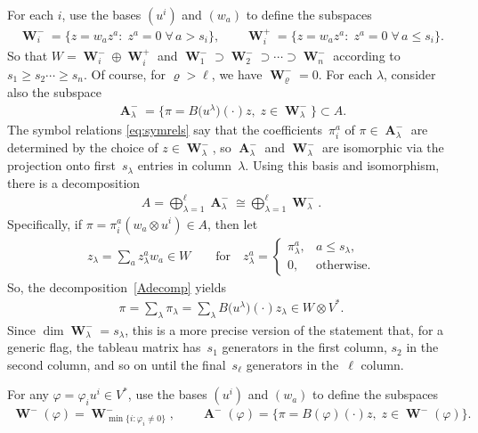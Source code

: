\documentclass[11pt]{article}
\numberwithin{equation}{section}
\DeclareMathOperator{\Au}{\mathbf{A}}
\DeclareMathOperator{\Wu}{\mathbf{W}}
\begin{document}
For each $i$, use the bases $(u^i)$ and $(w_a)$ to def\/ine the subspaces
\begin{gather*}
\Wu^-_i = \big\{ z =w_a z^a\colon \; z^a = 0\; \forall\, a > s_i \big\}, \qquad
\Wu^+_i = \big\{ z =w_a z^a\colon \;  z^a = 0\; \forall\, a \leq s_i \big\}.
\end{gather*}
So that $W =  \Wu^-_i \oplus \Wu^+_i$ and $\Wu^-_1 \supset
\Wu^-_2 \supset \cdots \supset \Wu^-_n$ according to $s_1 \geq s_2
\cdots \geq s_n$.  Of course, for $\varrho > \ell$, we have
$\Wu^-_\varrho = 0$.  For each $\lambda$, consider also the subspace
\begin{gather*}
\Au^-_\lambda = \big\{ \pi = B\big(u^\lambda\big)(\cdot)z,\; z \in \Wu^-_\lambda\big\} \subset
A.
\end{gather*}
The symbol relations \eqref{eq:symrels} say that the coef\/f\/icients~$\pi^a_i$ of
$\pi \in \Au^-_\lambda$ are
determined by the choice of $z \in \Wu^-_\lambda$, so
$\Au^-_\lambda$ and $\Wu^-_\lambda$ are isomorphic
via the projection onto f\/irst~$s_\lambda$ entries in column~$\lambda$.
Using this basis and isomorphism, there is a decomposition
\begin{gather}
A = \bigoplus_{\lambda=1}^\ell \Au^-_\lambda \cong \bigoplus_{\lambda=1}^\ell
\Wu^-_\lambda.
\label{Adecomp}
\end{gather}
Specif\/ically, if $\pi = \pi^a_i (w_a \otimes u^i) \in A$, then let
\begin{gather*}
z_\lambda = \sum_a z^a_\lambda w_a \in W \qquad \text{for} \quad z^a_\lambda =
\begin{cases}
\pi^a_\lambda,& a \leq s_\lambda,\\
0, & \text{otherwise}.
\end{cases}
\label{zdecomp}
\end{gather*}
So, the decomposition~\eqref{Adecomp} yields
\begin{gather*}
\pi = \sum_\lambda \pi_\lambda = \sum_\lambda B\big(u^\lambda\big)(\cdot)z_\lambda \in
W \otimes V^*.
\end{gather*}
Since $\dim \Wu^-_\lambda = s_\lambda$, this is a more precise version of the statement
that, for a generic f\/lag, the tableau matrix has~$s_1$ generators in the f\/irst
column, $s_2$ in the second column, and so on until the f\/inal~$s_\ell$
generators in the~$\ell$ column.

For any $\varphi = \varphi_i u^i \in V^*$, use the bases $(u^i)$ and $(w_a)$ to def\/ine the subspaces
\begin{gather*}
\Wu^-(\varphi)  = \Wu^-_{\min\{i\colon  \varphi_i \neq 0\}},\qquad
\Au^-(\varphi)  = \big\{ \pi = B(\varphi)(\cdot)z,\; z \in \Wu^-(\varphi)\big\}.
\end{gather*}
\end{document}
